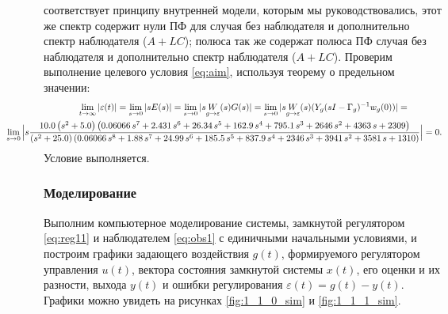 соответствует принципу внутренней модели, которым мы руководствовались, этот же спектр 
содержит нули ПФ для случая без наблюдателя и 
дополнительно спектр наблюдателя ($A+LC$); полюса так же содержат полюса ПФ случая без
наблюдателя и дополнительно спектр наблюдателя ($A+LC$).
Проверим выполнение целевого условия \eqref{eq:aim}, используя теорему о предельном
значении:
\begin{multline*}
    \lim_{t\rightarrow\infty}|\varepsilon(t)|=\lim_{s\rightarrow0}|sE(s)|=
        \lim_{s\rightarrow0}|s\underset{g\rightarrow\varepsilon}{W}(s)G(s)|=
        \lim_{s\rightarrow0}|s\underset{g\rightarrow\varepsilon}{W}(s)(Y_g(sI-\Gamma_g)^{-1}w_{g}(0))|=\\
            \hspace*{-1.5cm}\lim_{s\rightarrow0}\Big|s\frac{10.0\,{\left(s^2 +5.0\right)}\,{\left(0.06066\,s^7 +2.431\,s^6 +26.34\,s^5 +162.9\,s^4 +795.1\,s^3 +2646\,s^2 +4363\,s+2309\right)}}{{\left(s^2 +25.0\right)}\,{\left(0.06066\,s^8 +1.88\,s^7 +24.99\,s^6 +185.5\,s^5 +837.9\,s^4 +2346\,s^3 +3941\,s^2 +3581\,s+1310\right)}}\Big|=0.
        \end{multline*}
Условие выполняется.

\subsubsection{Моделирование}

Выполним компьютерное моделирование системы, замкнутой регулятором
\eqref{eq:reg11} и наблюдателем \eqref{eq:obs1} с единичными начальными условиями, 
и построим графики задающего воздействия $g(t)$, формируемого 
регулятором управления $u(t)$, вектора состояния замкнутой системы $x(t)$, его оценки и их разности, выхода
$y(t)$ и ошибки регулирования $\varepsilon(t) = g(t) - y(t)$. Графики можно
увидеть на рисунках \ref{fig:1_1_0_sim} и \ref{fig:1_1_1_sim}.

